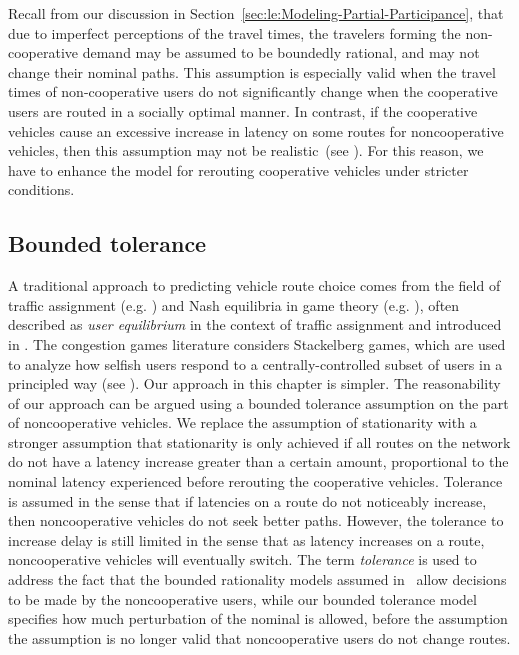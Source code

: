 Recall from our discussion in Section~\ref{sec:le:Modeling-Partial-Participance},
that due to imperfect perceptions of the travel times, the travelers
forming the non-cooperative demand may be assumed to be boundedly
rational, and may not change their nominal paths. This assumption
is especially valid when the travel times of non-cooperative users
do not significantly change when the cooperative users are routed
in a socially optimal manner. In contrast, if the cooperative vehicles
cause an excessive increase in latency on some routes for noncooperative
vehicles, then this assumption may not be realistic~(see \cite{aswani2011game,roughgarden2001stackelberg,krichenetac}).
For this reason, we have to enhance the model for rerouting cooperative
vehicles under stricter conditions.


\subsection{Bounded tolerance\label{sub:Motivating-limited-complacency}}

A traditional approach to predicting vehicle route choice comes from
the field of traffic assignment (e.g. \cite{wardrop1952some,lo2002cell,papageogiou1990})
and Nash equilibria in game theory (e.g. \cite{roughgarden2002bad,Papadimitriou2010}),
often described as \emph{user equilibrium} in the context of traffic
assignment and introduced in \cite{wardrop1952some}. The congestion
games literature considers Stackelberg games, which are used to analyze
how selfish users respond to a centrally-controlled subset of users
in a principled way (see \cite{Krichene2012a,roughgarden2001stackelberg}).
Our approach in this chapter is simpler. The reasonability of our approach
can be argued using a bounded tolerance assumption on the part of
noncooperative vehicles. We replace the assumption of stationarity
with a stronger assumption that stationarity is only achieved if all
routes on the network do not have a latency increase greater than
a certain amount, proportional to the nominal latency experienced
before rerouting the cooperative vehicles. Tolerance is assumed in
the sense that if latencies on a route do not noticeably increase,
then noncooperative vehicles do not seek better paths. However, the
tolerance to increase delay is still limited in the sense that as
latency increases on a route, noncooperative vehicles will eventually
switch. The term \emph{tolerance }is used to address the fact that
the bounded rationality models assumed in~\cite{Hu199751,Guo2011}
allow decisions to be made by the noncooperative users, while our
bounded tolerance model specifies how much perturbation of the nominal
is allowed, before the assumption the assumption is no longer valid
that noncooperative users do not change routes.


